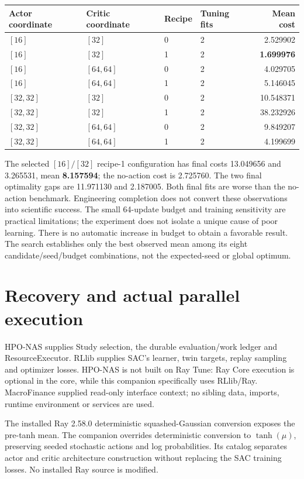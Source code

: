 \begin{center}
\begin{tabular}{llllr}
\toprule
Actor coordinate & Critic coordinate & Recipe & Tuning fits & Mean cost\\
\midrule
$[16]$ & $[32]$ & 0 & 2 & 2.529902\\
$[16]$ & $[32]$ & 1 & 2 & \textbf{1.699976}\\
$[16]$ & $[64,64]$ & 0 & 2 & 4.029705\\
$[16]$ & $[64,64]$ & 1 & 2 & 5.146045\\
$[32,32]$ & $[32]$ & 0 & 2 & 10.548371\\
$[32,32]$ & $[32]$ & 1 & 2 & 38.232926\\
$[32,32]$ & $[64,64]$ & 0 & 2 & 9.849207\\
$[32,32]$ & $[64,64]$ & 1 & 2 & 4.199699\\
\bottomrule
\end{tabular}
\end{center}

The selected $[16]/[32]$ recipe-1 configuration has final costs 13.049656 and
3.265531, mean \textbf{8.157594}; the no-action cost is 2.725760. The two final
optimality gaps are 11.971130 and 2.187005. Both final fits are worse than the
no-action benchmark. Engineering completion does not convert these observations
into scientific success. The small 64-update budget and training sensitivity
are practical limitations; the experiment does not isolate a unique cause of
poor learning. There is no automatic increase in budget to obtain a favorable
result. The search establishes only the best observed mean among its eight
candidate/seed/budget combinations, not the expected-seed or global optimum.

\section{Recovery and actual parallel execution}
HPO-NAS supplies Study selection, the durable evaluation/work ledger and
ResourceExecutor. RLlib supplies SAC's learner, twin targets, replay sampling
and optimizer losses. HPO-NAS is not built on Ray Tune: Ray Core execution is
optional in the core, while this companion specifically uses RLlib/Ray.
MacroFinance supplied read-only interface context; no sibling data, imports,
runtime environment or services are used.

The installed Ray 2.58.0 deterministic squashed-Gaussian conversion exposes
the pre-tanh mean. The companion overrides deterministic conversion to
$\tanh(\mu)$, preserving seeded stochastic actions and log probabilities.
Its catalog separates actor and critic architecture construction without
replacing the SAC training losses. No installed Ray source is modified.

